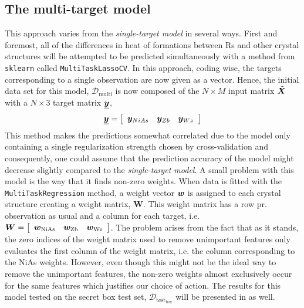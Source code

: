 \subsection{The multi-target model}
This approach varies from the \emph{single-target model} in several ways. First and foremost, all of the differences in heat of formations between Rs and other crystal structures will be attempted to be predicted simultaneously with a method from \texttt{sklearn} called \texttt{Multi\-Task\-LassoCV}. In this approach, coding wise, the targets corresponding to a single observation are now given as a vector. Hence, the initial data set for this model, $\mathcal{D}_{\mathrm{multi}}$ is now composed of the $N \times M$ input matrix $\tilde{\bm{X}}$ with a $N \times 3$ target matrix $\underline{\bm{y}}$,
\begin{equation}
    \underline{\bm{y}} = \qty[\begin{array}{ccc}
      \bm{y}_{NiAs}   &   \bm{y}_{Zb}   &   \bm{y}_{Wz}  
    \end{array}]
\end{equation}
This method makes the predictions somewhat correlated due to the model only containing a single regularization strength chosen by cross-validation and consequently, one could assume that the prediction accuracy of the model might decrease slightly compared to the \emph{single-target model}. A small problem with this model is the way that it finds non-zero weights. When data is fitted with the \texttt{MultiTaskRegression} method, a weight vector $\boldsymbol{w}$ is assigned to each crystal structure creating a weight matrix, $\boldsymbol{W}$. This weight matrix has a row pr. observation as usual and a column for each target, i.e. $\boldsymbol{W} = \qty[\begin{array}{ccc}
    \boldsymbol{w}_{\mathrm{NiAs}} & \boldsymbol{w}_{\mathrm{Zb}} & \boldsymbol{w}_{\mathrm{Wz}}
\end{array}]$. The problem arises from the fact that as it stands, the zero indices of the weight matrix used to remove unimportant features only evaluates the first column of the weight matrix, i.e. the column corresponding to the NiAs weights. However, even though this might not be the ideal way to remove the unimportant features, the non-zero weights almost exclusively occur for the same features which justifies our choice of action. The results for this model tested on the secret box test set, $\mathcal{D}_{\mathrm{test_{box}}}$ will be presented in  as well.

